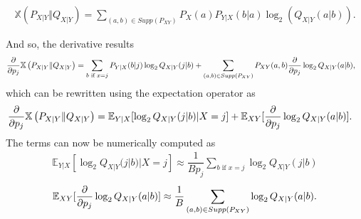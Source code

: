 \documentclass[english,aspectratio=1610,9pt,helvet,nicetitles]{ICEbeamerTUMCD}
\begin{document}
\begin{frame}
	
%	
%	
	
	\begin{align}
	\label{eqn:CE_expanded}
		\mathbb{X}\left(P_{X|Y} \Vert Q_{X|Y}\right) = \sum \limits_{(a,b) \in Supp(P_{XY})} P_X(a) P_{Y|X}(b|a) \log_2(Q_{X|Y}(a|b)). 
	\end{align}
	
	And so, the derivative results
	\begin{align}
		\pdv{p_j} \mathbb{X}\left(P_{X|Y} \Vert Q_{X|Y}\right) &= \sum \limits_{b \text{ if } x=j} P_{Y|X}(b|j) \log_2 Q_{X|Y}(j|b) 
		+ \sum \limits_{(a,b) \in Supp(P_{XY})} P_{XY}(a, b) \pdv{p_j} \log_2 Q_{X|Y}(a|b),
	\end{align}
	which can be rewritten using the expectation operator as
	\begin{align}
		\pdv{p_j} \mathbb{X}\left(P_{X|Y} \Vert Q_{X|Y}\right) &= \mathbb{E}_{Y|X}[ \log_2 Q_{X|Y}(j|b)| X=j] + \mathbb{E}_{XY}[ \pdv{p_j} \log_2 Q_{X|Y}(a|b)].
	\end{align}
	The terms can now be numerically computed as
	\begin{align}
	\label{eqn:CE_term_1}
		\mathbb{E}_{Y|X}[ \log_2 Q_{X|Y}(j|b)| X=j] \approx \dfrac{1}{Bp_j}\sum \limits_{b \text{ if } x=j} \log_2 Q_{X|Y}(j|b)
	\end{align}
	\begin{align}
	\label{eqn:CE_term_2}
		\mathbb{E}_{XY}[ \pdv{p_j} \log_2 Q_{X|Y}(a|b)] \approx \dfrac{1}{B} \sum \limits_{(a,b) \in Supp(P_{XY})} \log_2 Q_{X|Y}(a|b).
	\end{align}
	
	\end{frame}
\end{document}
